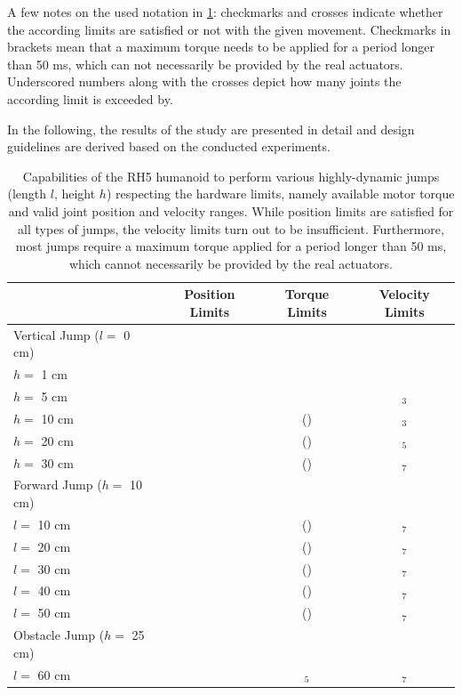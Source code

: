 A few notes on the used notation in \cref{tab:systemLimits}: checkmarks and crosses indicate whether the according limits are satisfied or not with the given movement. Checkmarks in brackets mean that a maximum torque needs to be applied for a period longer than 50 ms, which can not necessarily be provided by the real actuators. Underscored numbers along with the crosses depict how many joints the according limit is exceeded by.

In the following, the results of the study are presented in detail and design guidelines are derived based on the conducted experiments. 

\begin{table}[t]
\centering
\caption[Capabilities of the RH5 humanoid to perform highly-dynamic jumps]{Capabilities of the RH5 humanoid to perform various highly-dynamic jumps (length $l$, height $h$) respecting the hardware limits, namely available motor torque and valid joint position and velocity ranges. While position limits are satisfied for all types of jumps, the velocity limits turn out to be insufficient. Furthermore, most jumps require a maximum torque applied for a period longer than 50 ms, which cannot necessarily be provided by the real actuators.}
\begin{tabular}{lccc}
\hline
& Position Limits & Torque Limits & Velocity Limits\\ \hline
Vertical Jump ($l=$ 0 cm) & & & \\
\quad\quad $h=$ 1 cm 		& \greencheckmark  & \greencheckmark & \greencheckmark \\
\quad\quad $h=$ 5 cm 		& \greencheckmark  & \greencheckmark & \redxmark$_3$ \\
\quad\quad $h=$ 10 cm 		& \greencheckmark & (\greencheckmark) & \redxmark$_3$  \\
\quad\quad $h=$ 20 cm 		& \greencheckmark  & (\greencheckmark) & \redxmark$_5$ \\
\quad\quad $h=$ 30 cm 		& \greencheckmark  & (\greencheckmark) & \redxmark$_7$ \\ \hline
Forward Jump ($h=$ 10 cm)& & & \\
\quad\quad $l=$ 10 cm 		& \greencheckmark  & (\greencheckmark) & \redxmark$_7$ \\
\quad\quad $l=$ 20 cm 		& \greencheckmark  & (\greencheckmark) & \redxmark$_7$ \\
\quad\quad $l=$ 30 cm 		& \greencheckmark  & (\greencheckmark) & \redxmark$_7$ \\
\quad\quad $l=$ 40 cm 		& \greencheckmark  & (\greencheckmark) & \redxmark$_7$ \\
\quad\quad $l=$ 50 cm 		& \greencheckmark  & (\greencheckmark) & \redxmark$_7$ \\ \hline
Obstacle Jump ($h=$ 25 cm)& & & \\
\quad\quad $l=$ 60 cm 		& \greencheckmark  & \redxmark$_5$ & \redxmark$_7$ \\ \hline
\end{tabular}
\label{tab:systemLimits}
\end{table}

